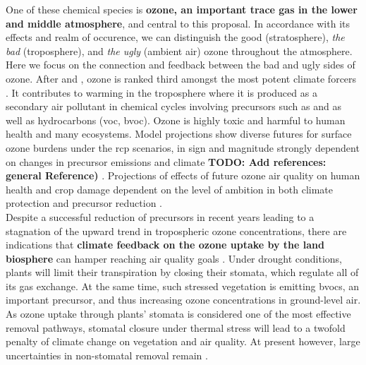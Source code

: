 One of these chemical species is \textbf{ozone, an important trace gas in the lower and middle atmosphere}, and central to this proposal. In accordance with its effects and realm of occurence, we can distinguish the good (stratosphere), \emph{the bad} (troposphere), and \emph{the ugly} (ambient air) ozone throughout the atmosphere. Here we focus on the connection and feedback between the bad and ugly sides of ozone. After  and , ozone is ranked third amongst the most potent climate forcers \parencite[Chapter 8]{IPCC2013}. It contributes to warming in the troposphere where it is produced as a secondary air pollutant in chemical cycles involving precursors such as  and  as well as hydrocarbons (\gls{voc}, \gls{bvoc}). Ozone is highly toxic and harmful to human health and many ecosystems. Model projections show diverse futures for surface ozone burdens under the \gls{rcp} scenarios, in sign and magnitude strongly dependent on changes in precursor emissions and climate \textbf{TODO: Add references: general Reference)} \parencites{JGR:Rieder2015}{AE:Rieder2018}{Nat:Skeie2020}. Projections of effects of future ozone air quality on human health and crop damage dependent on the level of ambition in both climate protection and precursor reduction \parencite{PTRS:Schneidemesser2020}.\\

Despite a successful reduction of precursors in recent years leading to a stagnation of the upward trend in tropospheric ozone concentrations, there are indications that \textbf{climate feedback on the ozone uptake by the land biosphere} can hamper reaching  air quality goals \parencite{NCC:Lin2020}. Under drought conditions, plants will limit their transpiration by closing their stomata, which regulate all of its gas exchange. At the same time, such stressed vegetation is emitting \glspl{bvoc}, an important precursor, and thus increasing ozone concentrations \ch{[O_3]} in ground-level air. As ozone uptake through plants’ stomata is considered one of the most effective removal pathways, stomatal closure under thermal stress will lead to a twofold penalty of climate change on vegetation and air quality. At present however, large uncertainties in non-stomatal removal remain \parencite{RG:Clifton2020}.\\

